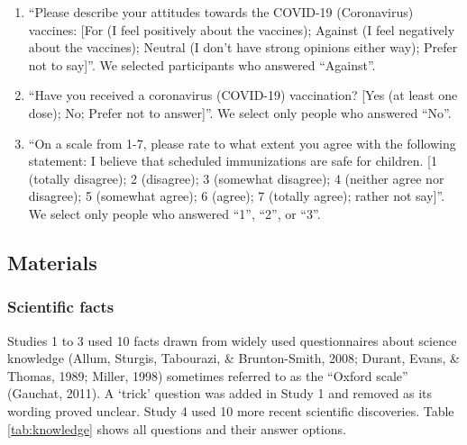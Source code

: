 \documentclass[
  doc,floatsintext]{apa6}
\providecommand{\tightlist}{%
  \setlength{\itemsep}{0pt}\setlength{\parskip}{0pt}}
\begin{document}
\begin{enumerate}
\def\labelenumi{\arabic{enumi}.}
\tightlist
\item
  ``Please describe your attitudes towards the COVID-19 (Coronavirus) vaccines: {[}For (I feel positively about the vaccines); Against (I feel negatively about the vaccines); Neutral (I don't have strong opinions either way); Prefer not to say{]}''. We selected participants who answered ``Against''.
\item
  ``Have you received a coronavirus (COVID-19) vaccination? {[}Yes (at least one dose); No; Prefer not to answer{]}''. We select only people who answered ``No''.
\item
  ``On a scale from 1-7, please rate to what extent you agree with the following statement: I believe that scheduled immunizations are safe for children. {[}1 (totally disagree); 2 (disagree); 3 (somewhat disagree); 4 (neither agree nor disagree); 5 (somewhat agree); 6 (agree); 7 (totally agree); rather not say{]}''. We select only people who answered ``1'', ``2'', or ``3''.
\end{enumerate}

\subsection{Materials}\label{materials-1}

\subsubsection{Scientific facts}\label{scientific-facts}

Studies 1 to 3 used 10 facts drawn from widely used questionnaires about science knowledge (Allum, Sturgis, Tabourazi, \& Brunton-Smith, 2008; Durant, Evans, \& Thomas, 1989; Miller, 1998) sometimes referred to as the ``Oxford scale'' (Gauchat, 2011). A `trick' question was added in Study 1 and removed as its wording proved unclear. Study 4 used 10 more recent scientific discoveries. Table \ref{tab:knowledge} shows all questions and their answer options.

\begingroup\fontsize{8}{10}\selectfont
\end{document}
